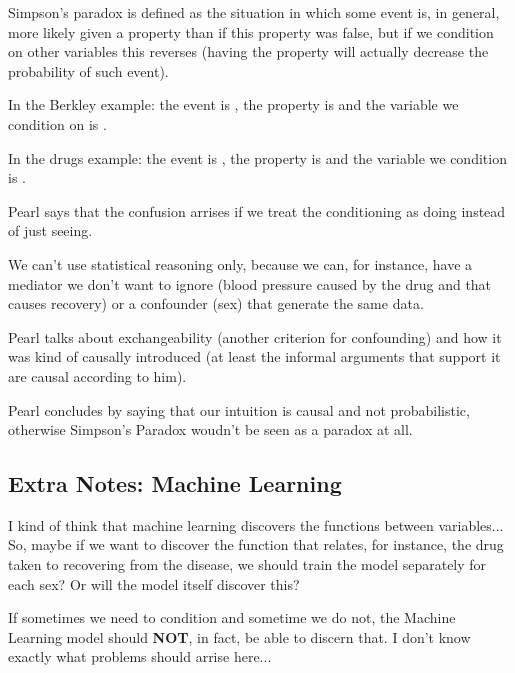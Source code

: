 Simpson's paradox is defined as the situation in which some event is, in general, more likely given a property than if this property was false, but if we condition on other variables this reverses (having the property will actually decrease the probability of such event).

In the Berkley example: the event is , the property is  and the variable we condition on is .

In the drugs example: the event is , the property is  and the variable we condition is .

Pearl says that the confusion arrises if we treat the conditioning as doing instead of just seeing.

We can't use statistical reasoning only, because we can, for instance, have a mediator we don't want to ignore (blood pressure caused by the drug and that causes recovery) or a confounder (sex) that generate the same data.

Pearl talks about exchangeability (another criterion for confounding) and how it was kind of causally introduced (at least the informal arguments that support it are causal according to him).

Pearl concludes by saying that our intuition is causal and not probabilistic, otherwise Simpson's Paradox woudn't be seen as a paradox at all.



\subsection{Extra Notes: Machine Learning}

I kind of think that machine learning discovers the functions between variables... So, maybe if we want to discover the function that relates, for instance, the drug taken to recovering from the disease, we should train the model separately for each sex? Or will the model itself discover this? 


If sometimes we need to condition and sometime we do not, the Machine Learning model should \textbf{NOT}, in fact, be able to discern that. I don't know exactly what problems should arrise here...
